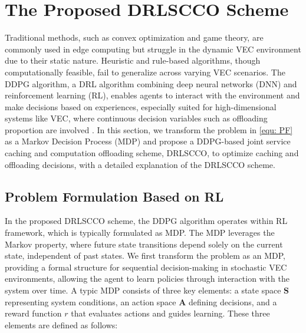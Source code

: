 \documentclass[lettersize,journal]{IEEEtran}
\begin{document}
\section{The Proposed DRLSCCO Scheme}
Traditional methods, such as convex optimization and game theory, are commonly used in edge computing but struggle in the dynamic VEC environment due to their static nature. Heuristic and rule-based algorithms, though computationally feasible, fail to generalize across varying VEC scenarios.  
The DDPG algorithm, a DRL algorithm combining deep neural networks (DNN) and reinforcement learning (RL), enables agents to interact with the environment and make decisions based on experiences, especially suited for high-dimensional systems like VEC, where continuous decision variables such as offloading proportion are involved \cite{DavidGuy-22}. 
In this section, we transform the problem in \eqref{equ: PF} as a Markov Decision Process (MDP) and propose a DDPG-based joint service caching and computation offloading scheme, DRLSCCO, to optimize caching and offloading decisions, with a detailed explanation of the DRLSCCO scheme.




\subsection{Problem Formulation Based on RL}
In the proposed DRLSCCO scheme, the DDPG algorithm operates within RL framework, which is typically formulated as  MDP. The MDP leverages the Markov property, where future state transitions depend solely on the current state, independent of past states.  
We first transform the problem as an MDP, providing a formal structure for sequential decision-making in stochastic VEC environments, allowing the agent to learn  policies through interaction with the system over time.  
A typic MDP consists of three key elements: a state space $ \mathbf{S} $ representing system conditions, an action space  $ \mathbf{A} $  defining  decisions, and a reward function  $ r $ that evaluates actions and guides learning. These three elements are defined as follows:
\end{document}
